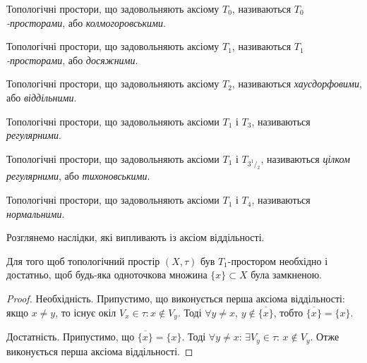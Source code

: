 \documentclass[a4paper, 12pt]{article}
\newcommand{\rfrac}[2]{^{#1\!}/_{#2}}
\begin{document}
\begin{definition}[Колмогоров, 1935]
	Топологічні простори, що
	задовольняють аксіому $T_0$, називаються \textit{$T_0$-просторами},
	або \textit{колмогоровськими}.
\end{definition}

\begin{definition}[Рісс, 1907]
	Топологічні простори, що
	задовольняють аксіому $T_1$, називаються \textit{$T_1$-просторами},
	або \textit{досяжними}.
\end{definition}

\begin{definition}[Хаусдорф, 1914]
	Топологічні простори, що
	задовольняють аксіому $T_2$, називаються \textit{хаусдорфовими},
	або \textit{віддільними}.
\end{definition}

\begin{definition}[В'єторіс, 1921]
	Топологічні простори, що
	задовольняють аксіоми $T_1$ і $T_3$, називаються \textit{регулярними}.
\end{definition}

\begin{definition}[Тихонов, 1930]
	Топологічні простори, що
	задовольняють аксіоми $T_1$ і $T_{3\rfrac{1}{2}}$, називаються \textit{цілком
	регулярними}, або \textit{тихоновськими}.
\end{definition}

\begin{definition}
	Топологічні простори, що задовольняють аксіоми
	$T_1$ і $T_4$, називаються \textit{нормальними}.
\end{definition}

Розглянемо наслідки, які випливають із аксіом
віддільності.

\begin{theorem}
	Для того щоб
	топологічний простір $(X, \tau)$ був $T_1$-простором необхідно і
	достатньо, щоб будь-яка одноточкова множина $\{x\} \subset X$
	була замкненою.
\end{theorem}

\begin{proof}
	Необхідність. Припустимо, що виконується
	перша аксіома віддільності: якщо $x \ne y$, то існує окіл
	$V_x \in \tau: x \notin V_y$. Тоді $\forall y \ne x$, $y \notin \overline{\{x\}}$, 
	тобто $\overline{\{x\}} = \{x\}$. \smallskip

	Достатність. Припустимо, що $\overline{\{x\}} = \{x\}$. Тоді
	$\forall y \ne x$: $\exists V_y \in \tau$: $x \notin V_y$. Отже виконується перша аксіома
	віддільності.
\end{proof}
\end{document}
